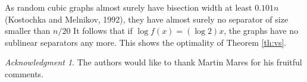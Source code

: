 \documentclass[a4paper]{amsart}
\theoremstyle{definition}
\theoremstyle{remark}
\newtheorem*{ack}{Acknowledgment}
\begin{document}
As random cubic graphs almost surely have bisection width at least
$0.101n$ (Kostochka and Melnikov, 1992), they have almost surely no
separator of size smaller than $n/20$ It follows that if $\log
f(x)=(\log 2)x$, the graphs have no sublinear separators any more.
This shows the optimality of Theorem \ref{th:vs}.
\begin{ack}
The authors would like to thank Martin Mares for his fruitful comments.
\end{ack}
% 
%

\providecommand{\bysame}{\leavevmode\hbox to3em{\hrulefill}\thinspace}
\providecommand{\MR}{\relax\ifhmode\unskip\space\fi MR }
\providecommand{\MRhref}[2]{%
  \href{http://www.ams.org/mathscinet-getitem?mr=#1}{#2}
}
\providecommand{\href}[2]{#2}
\end{document}
